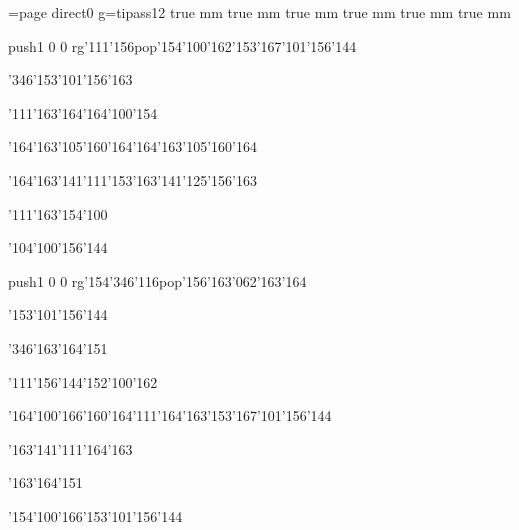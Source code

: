 \chardef\match=\pdfcolorstackinit page direct{0 g}\nopagenumbers\font\ipa=tipass12 true mm true mm true mm true mm true mm true mm
\null\vfill\ipa\centerline{\enskip\pdfcolorstack\match push{1 0 0 rg}\char'111\char'156\pdfcolorstack\match pop{}\enskip\char'154\char'100\char'162\enskip\char'153\char'167\char'101\char'156\char'144}\medskip\centerline{\enskip\char'346\enskip\enskip\enskip\enskip\enskip\char'153\char'101\char'156\char'163\enskip\enskip\enskip}\medskip\centerline{\enskip\enskip\enskip\enskip\enskip\enskip\enskip\enskip\enskip\enskip\enskip\enskip}\medskip\centerline{\enskip\enskip\enskip\enskip\char'111\char'163\char'164\enskip\enskip\enskip\enskip\char'164\char'100\char'154}\medskip\centerline{\enskip\enskip\enskip\enskip\enskip\char'164\char'163\char'105\char'160\char'164\enskip\char'164\char'163\char'105\char'160\char'164\enskip\enskip\enskip}\medskip\centerline{\enskip\enskip\enskip\enskip\enskip\enskip\enskip\enskip\enskip\enskip\enskip\enskip\enskip\enskip\enskip\enskip\enskip}\medskip\centerline{\enskip\char'164\char'163\char'141\char'111\char'153\enskip\enskip\enskip\enskip\char'163\char'141\char'125\char'156\char'163\enskip\enskip\enskip}\medskip\centerline{\enskip\char'111\enskip\char'163\char'154\char'100\enskip\enskip\enskip\enskip\enskip\enskip}\medskip\centerline{\enskip\enskip\enskip\enskip\enskip\enskip\enskip\enskip\enskip\enskip\enskip\char'104\char'100\char'156\char'144}\medskip\vfill\footline{\hfil\tt\folio\hfil}\eject
\null\vfill\ipa\centerline{\enskip\enskip\enskip\enskip\pdfcolorstack\match push{1 0 0 rg}\char'154\char'346\char'116\pdfcolorstack\match pop{}\enskip\char'156\char'163\char'062\char'163\char'164}\medskip\centerline{\enskip\enskip\enskip\enskip\enskip\enskip\enskip\char'153\char'101\char'156\char'144\enskip\enskip\enskip}\medskip\centerline{\enskip\char'346\enskip\char'163\char'164\char'151\enskip\enskip\enskip\enskip\enskip\enskip}\medskip\centerline{\enskip\enskip\enskip\enskip\char'111\char'156\char'144\enskip\enskip\enskip\enskip\char'152\char'100\char'162}\medskip\centerline{\enskip\char'164\char'100\char'166\enskip\char'160\char'164\char'111\char'164\char'163\enskip\char'153\char'167\char'101\char'156\char'144\enskip\enskip\enskip}\medskip\centerline{\enskip\enskip\enskip\enskip\enskip\enskip\enskip\enskip\enskip\enskip\enskip\enskip\enskip\enskip\enskip\enskip\enskip}\medskip\centerline{\enskip\enskip\enskip\enskip\enskip\enskip\enskip\enskip\enskip\enskip\char'163\char'141\char'111\char'164\char'163\enskip\enskip\enskip}\medskip\centerline{\enskip\enskip\enskip\char'163\char'164\char'151\enskip\enskip\enskip\enskip\enskip\enskip}\medskip\centerline{\enskip\enskip\enskip\enskip\enskip\enskip\enskip\char'154\char'100\char'166\enskip\char'153\char'101\char'156\char'144}\medskip\vfill\footline{\hfil\tt\folio\hfil}\eject

